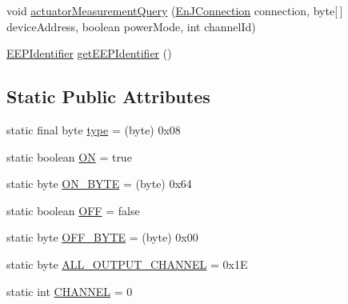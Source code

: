 \begin{DoxyCompactItemize}
\item 
void \hyperlink{classit_1_1polito_1_1elite_1_1enocean_1_1enj_1_1eep_1_1eep26_1_1_d2_1_1_d201_1_1_d20108_acb910910d58e326fd387a523a0461b5b}{actuator\+Measurement\+Query} (\hyperlink{classit_1_1polito_1_1elite_1_1enocean_1_1enj_1_1communication_1_1_en_j_connection}{En\+J\+Connection} connection, byte\mbox{[}$\,$\mbox{]} device\+Address, boolean power\+Mode, int channel\+Id)
\item 
\hyperlink{classit_1_1polito_1_1elite_1_1enocean_1_1enj_1_1eep_1_1_e_e_p_identifier}{E\+E\+P\+Identifier} \hyperlink{classit_1_1polito_1_1elite_1_1enocean_1_1enj_1_1eep_1_1eep26_1_1_d2_1_1_d201_1_1_d20108_a19718c7e8280b6a4295a528c2f6974dc}{get\+E\+E\+P\+Identifier} ()
\end{DoxyCompactItemize}
\subsection*{Static Public Attributes}
\begin{DoxyCompactItemize}
\item 
static final byte \hyperlink{classit_1_1polito_1_1elite_1_1enocean_1_1enj_1_1eep_1_1eep26_1_1_d2_1_1_d201_1_1_d20108_afe5e816ada440b041c6af8f0ac3ca60d}{type} = (byte) 0x08
\item 
static boolean \hyperlink{classit_1_1polito_1_1elite_1_1enocean_1_1enj_1_1eep_1_1eep26_1_1_d2_1_1_d201_1_1_d20108_a445a6161889d0f003675c6701798063f}{ON} = true
\item 
static byte \hyperlink{classit_1_1polito_1_1elite_1_1enocean_1_1enj_1_1eep_1_1eep26_1_1_d2_1_1_d201_1_1_d20108_aae1223c108c72c3e0d8536e7fe60304c}{O\+N\+\_\+\+B\+Y\+TE} = (byte) 0x64
\item 
static boolean \hyperlink{classit_1_1polito_1_1elite_1_1enocean_1_1enj_1_1eep_1_1eep26_1_1_d2_1_1_d201_1_1_d20108_a96f02224fb8f8e94ed2b35960b269634}{O\+FF} = false
\item 
static byte \hyperlink{classit_1_1polito_1_1elite_1_1enocean_1_1enj_1_1eep_1_1eep26_1_1_d2_1_1_d201_1_1_d20108_a6339cb03e11e0eeacf19baeb4d8dff67}{O\+F\+F\+\_\+\+B\+Y\+TE} = (byte) 0x00
\item 
static byte \hyperlink{classit_1_1polito_1_1elite_1_1enocean_1_1enj_1_1eep_1_1eep26_1_1_d2_1_1_d201_1_1_d20108_a734bd3e2685e8e5c26d670f632335ec4}{A\+L\+L\+\_\+\+O\+U\+T\+P\+U\+T\+\_\+\+C\+H\+A\+N\+N\+EL} = 0x1E
\item 
static int \hyperlink{classit_1_1polito_1_1elite_1_1enocean_1_1enj_1_1eep_1_1eep26_1_1_d2_1_1_d201_1_1_d20108_a3380c5f4703d284afe6b0e30e0a6b2be}{C\+H\+A\+N\+N\+EL} = 0
\end{DoxyCompactItemize}

